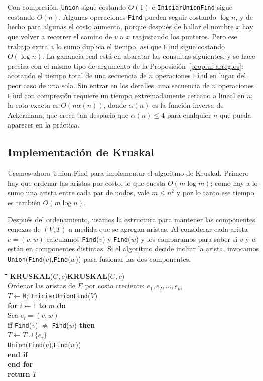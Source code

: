 \documentclass[12pt, spanish, oneside, openany]{book}
\newcommand{\pl}[1]{\makebox[1.6em][r]{\texttt{\footnotesize #1}}\hspace{0.9em}}
\newenvironment{pseudo}[1]{%
  \begin{center}%
  \begin{mdframed}[style=pseudobox]%
  \small
  \begin{tabbing}%
  \hspace{2.5em}\=\hspace{1.5em}\=\hspace{1.5em}\=\hspace{1.5em}\=\hspace{1.5em}\=\kill
  \def\pseudotitulo{#1}\ifx\pseudotitulo\empty\else#1\\[3pt]\fi}%
  {\end{tabbing}\end{mdframed}\end{center}}
\theoremstyle{uprightplain}
\theoremstyle{definition}
\theoremstyle{remark}
\theoremstyle{definition}
\begin{document}
Con compresión, \texttt{Union} sigue costando $O(1)$ e \texttt{IniciarUnionFind} sigue costando $O(n)$. Algunas operaciones \texttt{Find} pueden seguir costando $\log n$, y de hecho para algunas el costo aumenta, porque después de hallar el nombre $x$ hay que volver a recorrer el camino de $v$ a $x$ reajustando los punteros. Pero ese trabajo extra a lo sumo duplica el tiempo, así que \texttt{Find} sigue costando $O(\log n)$. La ganancia real está en abaratar las consultas siguientes, y se hace precisa con el mismo tipo de argumento de la Proposición~\ref{prop:uf-arreglos}: acotando el tiempo total de una secuencia de $n$ operaciones \texttt{Find} en lugar del peor caso de una sola. Sin entrar en los detalles, una secuencia de $n$ operaciones \texttt{Find} con compresión requiere un tiempo extremadamente cercano a lineal en $n$; la cota exacta es $O(n\alpha(n))$, donde $\alpha(n)$ es la función inversa de Ackermann, que crece tan despacio que $\alpha(n) \le 4$ para cualquier $n$ que pueda aparecer en la práctica.

\subsection{Implementación de Kruskal}

Usemos ahora Union-Find para implementar el algoritmo de Kruskal. Primero hay que ordenar las aristas por costo, lo que cuesta $O(m\log m)$; como hay a lo sumo una arista entre cada par de nodos, vale $m \le n^2$ y por lo tanto ese tiempo es también $O(m\log n)$.

Después del ordenamiento, usamos la estructura para mantener las componentes conexas de $(V,T)$ a medida que se agregan aristas. Al considerar cada arista $e=(v,w)$ calculamos \texttt{Find}($v$) y \texttt{Find}($w$) y los comparamos para saber si $v$ y $w$ están en componentes distintas. Si el algoritmo decide incluir la arista, invocamos \texttt{Union}(\texttt{Find}($v$),\texttt{Find}($w$)) para fusionar las dos componentes.

\begin{pseudo}{\textbf{KRUSKAL}($G,c$)}
\pl{1}\> Ordenar las aristas de $E$ por costo creciente: $e_1,e_2,\dots,e_m$\\
\pl{2}\> $T \leftarrow \emptyset$; \quad \texttt{IniciarUnionFind}($V$)\\
\pl{3}\> \textbf{for} $i \leftarrow 1$ \textbf{to} $m$ \textbf{do}\\
\pl{4}\>\> Sea $e_i=(v,w)$\\
\pl{5}\>\> \textbf{if} \texttt{Find}($v$) $\neq$ \texttt{Find}($w$) \textbf{then}\\
\pl{6}\>\>\> $T \leftarrow T \cup \{e_i\}$\\
\pl{7}\>\>\> \texttt{Union}(\texttt{Find}($v$),\texttt{Find}($w$))\\
\pl{8}\>\> \textbf{end if}\\
\pl{9}\> \textbf{end for}\\
\pl{10}\> \textbf{return} $T$
\end{pseudo}
\end{document}
